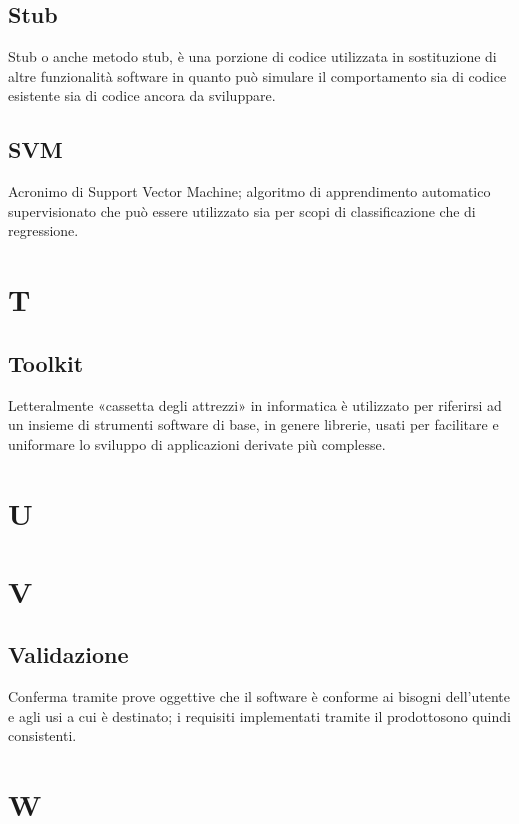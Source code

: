 \subsection*{Stub}
Stub o anche metodo stub, è una porzione di codice utilizzata in sostituzione di altre funzionalità software in quanto può simulare il comportamento sia di codice esistente sia di codice ancora da sviluppare.

\subsection*{SVM}
Acronimo di Support Vector Machine; algoritmo di apprendimento automatico supervisionato che può essere utilizzato sia per scopi di classificazione che di regressione.

\clearpage
\section*{T}

\subsection*{Toolkit}
Letteralmente «cassetta degli attrezzi» in informatica è utilizzato per riferirsi ad un insieme di strumenti software di base, in genere librerie, usati per facilitare e uniformare lo sviluppo di applicazioni derivate più complesse. 

\clearpage
\section*{U}

\clearpage
\section*{V}

\subsection*{Validazione}
Conferma tramite prove oggettive che il software è conforme ai bisogni dell'utente e agli usi a cui è destinato; i requisiti implementati tramite il prodotto\glosp sono quindi consistenti.

\clearpage
\section*{W}

